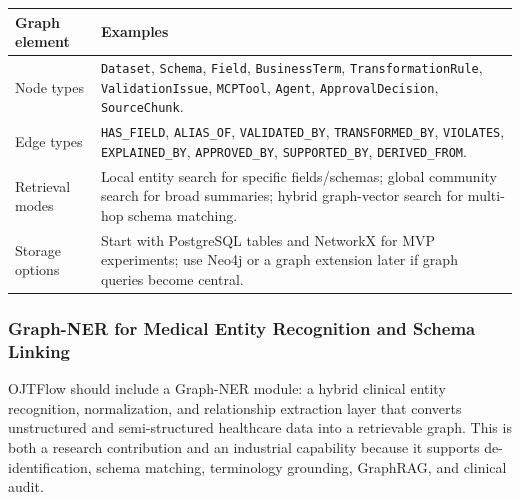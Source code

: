 \begin{tabularx}{\textwidth}{p{}X}
\toprule
\textbf{Graph element} & \textbf{Examples} \\
\midrule
Node types & \texttt{Dataset}, \texttt{Schema}, \texttt{Field}, \texttt{BusinessTerm}, \texttt{TransformationRule}, \texttt{ValidationIssue}, \texttt{MCPTool}, \texttt{Agent}, \texttt{ApprovalDecision}, \texttt{SourceChunk}. \\
Edge types & \texttt{HAS\_FIELD}, \texttt{ALIAS\_OF}, \texttt{VALIDATED\_BY}, \texttt{TRANSFORMED\_BY}, \texttt{VIOLATES}, \texttt{EXPLAINED\_BY}, \texttt{APPROVED\_BY}, \texttt{SUPPORTED\_BY}, \texttt{DERIVED\_FROM}. \\
Retrieval modes & Local entity search for specific fields/schemas; global community search for broad summaries; hybrid graph-vector search for multi-hop schema matching. \\
Storage options & Start with PostgreSQL tables and NetworkX for MVP experiments; use Neo4j or a graph extension later if graph queries become central. \\
\bottomrule
\end{tabularx}

\subsubsection{Graph-NER for Medical Entity Recognition and Schema Linking}

OJTFlow should include a Graph-NER module: a hybrid clinical entity recognition, normalization, and relationship extraction layer that converts unstructured and semi-structured healthcare data into a retrievable graph. This is both a research contribution and an industrial capability because it supports de-identification, schema matching, terminology grounding, GraphRAG, and clinical audit.

